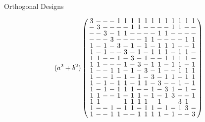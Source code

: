 \documentclass{beamer}
\begin{document}
\begin{frame}{Orthogonal Designs}

  \[
      (a^2+b^2)
      \arraycolsep=1.0pt\def\arraystretch{0.75}
      \left(
      \begin{array}{cccccccccccccccc}
        3&-&-&-&1&1&1&1&1&1&1&1&1&1&1&1\\
        -&3&-&-&-&-&1&1&-&-&-&-&1&1&-&-\\
        -&-&3&-&1&1&-&-&-&-&1&1&-&-&-&-\\
        -&-&-&3&-&-&-&-&1&1&-&-&-&-&1&1\\
        1&-&1&-&3&-&1&-&1&-&1&1&1&-&-&1\\
        1&-&1&-&-&3&-&1&-&1&1&1&-&1&1&-\\
        1&1&-&-&1&-&3&-&1&-&-&1&1&1&1&-\\
        1&1&-&-&-&1&-&3&-&1&1&-&1&1&-&1\\
        1&-&-&1&1&-&1&-&3&-&1&-&-&1&1&1\\
        1&-&-&1&-&1&-&1&-&3&-&1&1&-&1&1\\
        1&-&1&-&1&1&-&1&1&-&3&-&-&1&-&1\\
        1&-&1&-&1&1&1&-&-&1&-&3&1&-&1&-\\
        1&1&-&-&1&-&1&1&-&1&-&1&3&-&-&1\\
        1&1&-&-&-&1&1&1&1&-&1&-&-&3&1&-\\
        1&-&-&1&-&1&1&-&1&1&-&1&-&1&3&-\\
        1&-&-&1&1&-&-&1&1&1&1&-&1&-&-&3\\
      \end{array}
    \right)
  \]
  
\end{frame}
\end{document}
